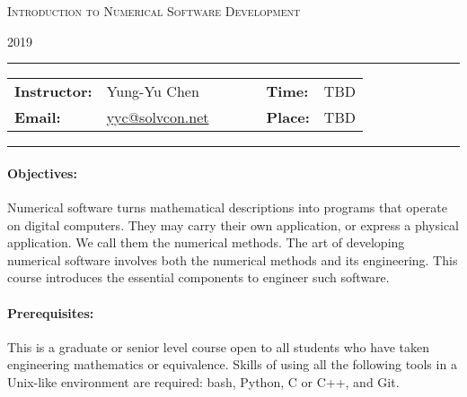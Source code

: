 \documentclass[11pt,a4paper]{article}
\begin{document}
\begin{center}
{\Large \textsc{Introduction to Numerical Software Development}}
\end{center}
\begin{center}
2019
\end{center}

\begin{center}
\rule{6in}{0.4pt}
\begin{minipage}[t]{.75\textwidth}
\begin{tabular}{llcccll}
\textbf{Instructor:} & Yung-Yu Chen & & &  &
\textbf{Time:} & TBD \\
\textbf{Email:} & \href{mailto:yyc@solvcon.net}{yyc@solvcon.net} & & & &
\textbf{Place:} & TBD
\end{tabular}
\end{minipage}
\rule{6in}{0.4pt}
\end{center}



\paragraph{Objectives:}

Numerical software turns mathematical descriptions into programs that operate
on digital computers.  They may carry their own application, or express a
physical application.  We call them the numerical methods.  The art of
developing numerical software involves both the numerical methods and its
engineering.  This course introduces the essential components to engineer such
software.

\paragraph{Prerequisites:}

This is a graduate or senior level course open to all students who have taken
engineering mathematics or equivalence.  Skills of using all the following
tools in a Unix-like environment are required: bash, Python, C or C++, and Git.
\end{document}
